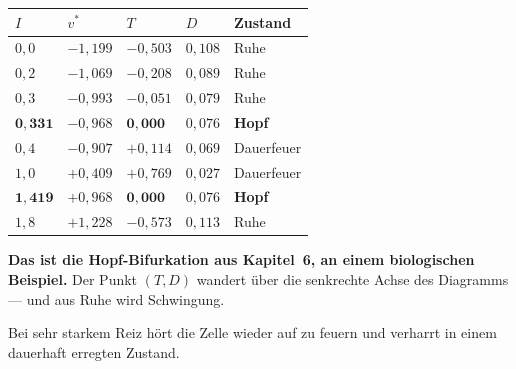 \begin{merksatz}
\begin{center}
{\small
\renewcommand{\arraystretch}{1.45}
\begin{tabular}{@{}P{1.4cm}P{1.8cm}P{1.8cm}P{1.6cm}P{1.8cm}@{}}
\toprule
$I$ & $v^{*}$ & $T$ & $D$ & \textbf{Zustand}\\
\midrule
$0{,}0$ & $-1{,}199$ & $-0{,}503$ & $0{,}108$ & \textcolor{gruen}{Ruhe}\\
$0{,}2$ & $-1{,}069$ & $-0{,}208$ & $0{,}089$ & \textcolor{gruen}{Ruhe}\\
$0{,}3$ & $-0{,}993$ & $-0{,}051$ & $0{,}079$ & \textcolor{gruen}{Ruhe}\\
$\mathbf{0{,}331}$ & $-0{,}968$ & $\mathbf{0{,}000}$ & $0{,}076$ & \textcolor{akzent}{\textbf{Hopf}}\\
$0{,}4$ & $-0{,}907$ & $+0{,}114$ & $0{,}069$ & \textcolor{akzent}{Dauerfeuer}\\
$1{,}0$ & $+0{,}409$ & $+0{,}769$ & $0{,}027$ & \textcolor{akzent}{Dauerfeuer}\\
$\mathbf{1{,}419}$ & $+0{,}968$ & $\mathbf{0{,}000}$ & $0{,}076$ & \textcolor{akzent}{\textbf{Hopf}}\\
$1{,}8$ & $+1{,}228$ & $-0{,}573$ & $0{,}113$ & \textcolor{gruen}{Ruhe}\\
\bottomrule
\end{tabular}}
\end{center}

\begin{center}
\begin{minipage}{0.9\textwidth}
\textbf{Das ist die Hopf-Bifurkation aus Kapitel~6, an einem biologischen Beispiel.} Der Punkt $(T,D)$ wandert über die senkrechte Achse des Diagramms --- und aus Ruhe wird Schwingung.
\end{minipage}
\end{center}

Bei sehr starkem Reiz hört die Zelle wieder auf zu feuern und verharrt in einem dauerhaft erregten Zustand.

\begin{center}
\begin{minipage}{0.88\textwidth}
\end{minipage}
\end{center}
\end{merksatz}

